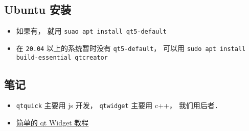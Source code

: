 
\begin{issues}
\issueDraft
\end{issues}

\subsection{Ubuntu 安装}
\begin{itemize}
\item 如果有， 就用 \verb|suao apt install qt5-default|
\item 在 \verb|20.04| 以上的系统暂时没有 \verb|qt5-default|， 可以用 \verb|sudo apt install build-essential qtcreator|
\end{itemize}

\subsection{笔记}
\begin{itemize}
\item \verb|qtquick| 主要用 js 开发，  \verb|qtwidget| 主要用 c++， 我们用后者．
\item \href{https://doc.qt.io/qt-5/qtwidgets-tutorials-notepad-example.html}{简单的 qt Widget 教程}
\end{itemize}
